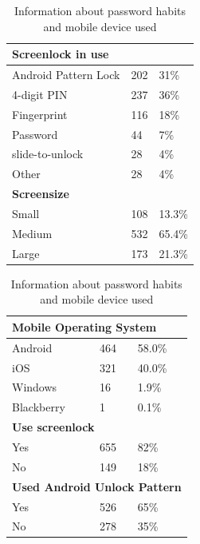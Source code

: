 {{    %
    \begin{table}[H]
      \parbox{.48\linewidth}{
        \centering
        \begin{tabular}{ l | l l }
          \hline
          \multicolumn{3}{l}{\bf Screenlock in use} \\ \hline
          Android Pattern Lock & 202 & 31\% \\
          4-digit PIN & 237 & 36\% \\
          Fingerprint & 116 & 18\% \\
          Password & 44 & 7\% \\
          slide-to-unlock & 28 & 4\% \\
          Other & 28 & 4\% \\ \hline
            
          \multicolumn{3}{l}{\bf Screensize} \\ \hline
          Small & 108 & 13.3\% \\
          Medium & 532 & 65.4\% \\ 
          Large & 173 & 21.3\% \\ \hline
        \end{tabular}
      }
      \hfill
      \parbox{.48\linewidth}{
        \centering
        \begin{tabular}{ l | l l }
          \hline
          \multicolumn{3}{l}{\bf Mobile Operating System} \\ \hline
          Android & 464 & 58.0\% \\
          iOS & 321 & 40.0\% \\
          Windows & 16 & 1.9\% \\
          Blackberry & 1 & 0.1\% \\ \hline

          \multicolumn{3}{l}{\bf Use screenlock} \\ \hline
          Yes & 655 & 82\% \\
          No & 149 & 18\% \\ \hline

          \multicolumn{3}{l}{\bf Used Android Unlock Pattern} \\ \hline
          Yes & 526 & 65\% \\ 
          No & 278 & 35\% \\ \hline
        \end{tabular}
      }
      \caption{Information about password habits and mobile device used}
      \label{tab:screenlockHabits}
    \end{table}

}}

